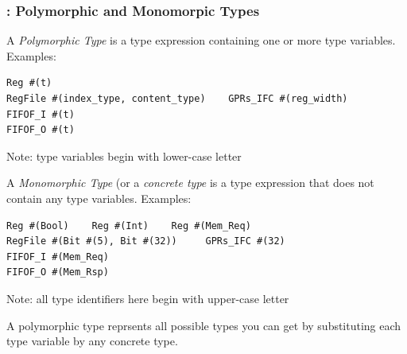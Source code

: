 
\begin{frame}[fragile]
\frametitle{{\BSV}: Polymorphic and Monomorpic Types}

\footnotesize

A \emph{Polymorphic Type} is a type expression containing one or more
type variables. Examples:

\vspace{1ex}

\begin{center}
 \begin{minipage}{0.6\textwidth}
  \begin{Verbatim}[frame=single]
Reg #(t)
RegFile #(index_type, content_type)    GPRs_IFC #(reg_width)
FIFOF_I #(t)
FIFOF_O #(t)
  \end{Verbatim}
 \end{minipage}
 \begin{minipage}{0.35\textwidth}
  Note: type variables begin with lower-case letter
 \end{minipage}
\end{center}

\vspace{1ex}

A \emph{Monomorphic Type} (or a \emph{concrete type} is a type
expression that does not contain any type variables.  Examples:

\vspace{1ex}

\begin{center}
 \begin{minipage}{0.6\textwidth}
  \begin{Verbatim}[frame=single]
Reg #(Bool)    Reg #(Int)    Reg #(Mem_Req)
RegFile #(Bit #(5), Bit #(32))     GPRs_IFC #(32)
FIFOF_I #(Mem_Req)
FIFOF_O #(Mem_Rsp)
  \end{Verbatim}
 \end{minipage}
 \begin{minipage}{0.35\textwidth}
  Note: all type identifiers here begin with upper-case letter
 \end{minipage}
\end{center}

\vspace{1ex}

A polymorphic type reprsents all possible types you can get by
substituting each type variable by any concrete type.

\end{frame}

